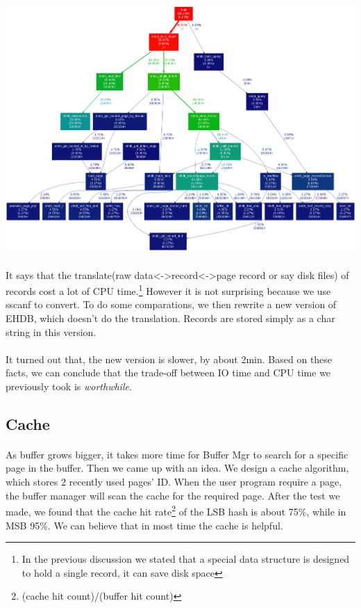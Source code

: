 \documentclass{article}
\begin{document}
        \paragraph{} \includegraphics[scale=0.3]{img/proff_big_record.png}
        \paragraph{}
            It says that the translate(raw data<->record<->page record or say disk files) of records cost a lot of CPU time.\footnote{In the previous discussion we stated that a special data structure is designed to hold a single record, it can save disk space} However it is not surprising because we use sscanf to convert. To do some comparations, we then rewrite a new version of EHDB, which doesn't do the translation. Records are stored simply as a char string in this version.
        \paragraph{}
            It turned out that, the new version is slower, by about 2min. Based on these facts, we can conclude that the trade-off between IO time and CPU time we previously took is \emph{worthwhile}.
    \subsection{Cache}
        \paragraph{}
            As buffer grows bigger, it takes more time for Buffer Mgr to search for a specific page in the buffer. Then we came up with an idea. We design a cache algorithm, which stores 2 recently used pages' ID. When the user program require a page, the buffer manager will scan the cache for the required page. After the test we made, we found that the cache hit rate\footnote{(cache hit count)/(buffer hit count)} of the LSB hash is about 75\%, while in MSB 95\%. We can believe that in most time the cache is helpful. 
\end{document}
